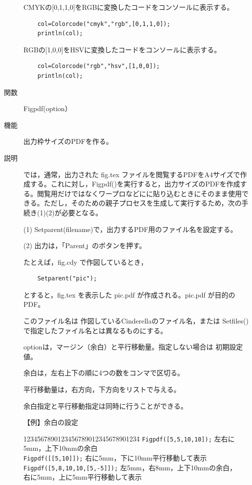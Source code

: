 \documentclass[papersize,a4paper,12pt,uplatex]{jsarticle}
\begin{document}
\begin{description}
CMYKの[0,1,1,0]をRGBに変換したコードをコンソールに表示する。

\begin{verbatim}
    col=Colorcode("cmyk","rgb",[0,1,1,0]);
    println(col); 
\end{verbatim}
    
RGBの[1,0,0]をHSVに変換したコードをコンソールに表示する。

\begin{verbatim}
    col=Colorcode("rgb","hsv",[1,0,0]);
    println(col); 
\end{verbatim}

\vspace{\baselineskip}
\hypertarget{figpdf}{}
\item[関数]  Figpdf(option）
\item[機能]  出力枠サイズのPDFを作る。
\item[説明]  \ketcindy では，通常，出力された fig.tex ファイルを閲覧するPDFをA4サイズで作成する。これに対し，Figpdf()を実行すると，出力サイズのPDFを作成する。閲覧用だけではなくワープロなどにに貼り込むときにそのまま使用できる。ただし，そのための親子プロセスを生成して実行するため，次の手続き(1)(2)が必要となる。

\vspace{\baselineskip}
(1) Setparent(filename)で，出力するPDF用のファイル名を設定する。

(2) 出力は，「Parent」のボタンを押す。

\vspace{\baselineskip}
たとえば，fig.cdy で作図しているとき，
\begin{verbatim}
    Setparent("pic");
\end{verbatim}
とすると，fig.tex を表示した pic.pdf が作成される。pic.pdf が目的のPDF。
  
このファイル名は 作図しているCinderellaのファイル名，または Setfiles() で指定したファイル名とは異なるものにする。

optionは，マージン（余白）と平行移動量。指定しない場合は 初期設定値。

余白は，左右上下の順に4つの数をコンマで区切る。

平行移動量は，右方向，下方向をリストで与える。

余白指定と平行移動指定は同時に行うことができる。

\vspace{\baselineskip}
【例】余白の設定
\begin{tabbing}
1234\=567890123456789012345678901234\=\kill
 \> \verb|Figpdf([5,5,10,10]);|      \> 左右に5mm，上下10mmの余白\\
 \> \verb|Figpdf([[5,10]]);|      \>  右に5mm，下に10mm平行移動して表示\\
 \> \verb|Figpdf([5,8,10,10,[5,-5]]);|     \> 左5mm，右8mm，上下10mmの余白，\\
  \>                                        \> 右に5mm，上に5mm平行移動して表示
\end{tabbing}
                                      

\end{description}
\end{document}
